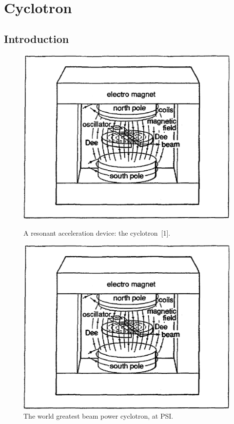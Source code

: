 



\chapter[Cyclotron]{Cyclotron}\label{chapCyclotron}


\section{Introduction \label{secCycloIntro}}

\begin{figure}[ht]
\centering
\sidebyside
{
    \includegraphics[width=0.45\linewidth]{./figs_cyclo/LBLCycloSketch.eps}
    \caption{A  resonant acceleration device: the cyclotron~[1].} %
    \label{figLBLCycloSketch}
}{
    \includegraphics[width=0.45\linewidth]{./figs_cyclo/LBLCycloSketch.eps}
    \caption{The world greatest beam power cyclotron, at PSI.}
    \label{fig1.3}
}
\end{figure}

